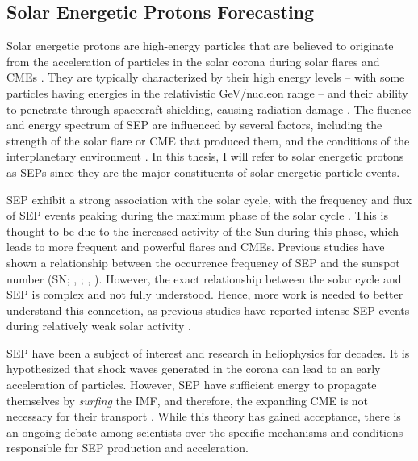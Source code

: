 \subsection{Solar Energetic Protons Forecasting}
Solar energetic protons are high-energy particles that are believed to originate from the acceleration of particles in the solar corona during solar flares and CMEs \citep{aschwanden_2002, lin_2005, lin_2011, klein_2017, kahler_2017}. They are typically characterized by their high energy levels -- with some particles having energies in the relativistic GeV/nucleon range -- and their ability to penetrate through spacecraft shielding, causing radiation damage \citep{reames_2013, desai_2016}. The fluence and energy spectrum of SEP are influenced by several factors, including the strength of the solar flare or CME that produced them, and the conditions of the interplanetary environment \citep{kahler_1984, kahler_1987, debrunner_1988, miteva_2013, trottet_2015, dierckxsens_2015, le_2017, gopalswamy_2017}. In this thesis, I will refer to solar energetic protons as SEPs since they are the major constituents of solar energetic particle events.

SEP exhibit a strong association with the solar cycle, with the frequency and flux of SEP events peaking during the maximum phase of the solar cycle \citep{reames_2013}. This is thought to be due to the increased activity of the Sun during this phase, which leads to more frequent and powerful flares and CMEs. Previous studies have shown a relationship between the occurrence frequency of SEP and the sunspot number (SN; \citeauthor{nymmik_2007}, \citeyear{nymmik_2007}; \citeauthor{richardson_2016}, \citeyear{richardson_2016}). However, the exact relationship between the solar cycle and SEP is complex and not fully understood. Hence, more work is needed to better understand this connection, as previous studies have reported intense SEP events during relatively weak solar activity \citep{cohen_2018, ramstad_2018}.

SEP have been a subject of interest and research in heliophysics for decades. It is hypothesized that shock waves generated in the corona can lead to an early acceleration of particles. However, SEP have sufficient energy to propagate themselves by \textit{surfing} the IMF, and therefore, the expanding CME is not necessary for their transport \citep{reames_2000, kota_2005, kozarev_2019, kozarev_2022}. While this theory has gained acceptance, there is an ongoing debate among scientists over the specific mechanisms and conditions responsible for SEP production and acceleration.

